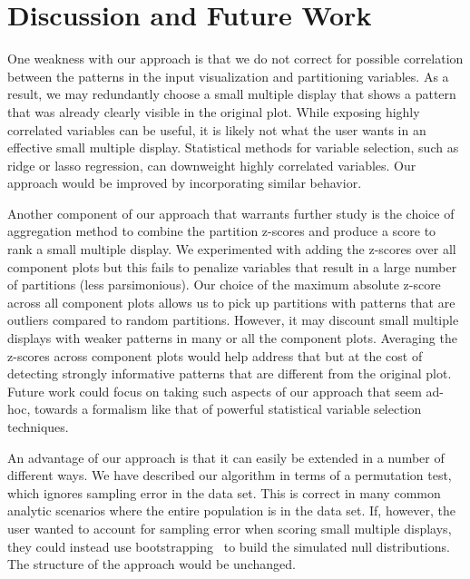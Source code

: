 \section{Discussion and Future Work}
\label{sec:discussion}
One weakness with our approach is that we do not correct for possible correlation between the patterns in the input visualization and partitioning variables. As a result, we may redundantly choose a small multiple display that shows a pattern that was already clearly visible in the original plot. While exposing highly correlated variables can be useful, it is likely not what the user wants in an effective small multiple display. Statistical methods for variable selection, such as ridge or lasso regression, can downweight highly correlated variables. Our approach would be improved by incorporating similar behavior. 

Another component of our approach that warrants further study is the choice of aggregation method to combine the partition z-scores and produce a score to rank a small multiple display. We experimented with adding the z-scores over all component plots but this fails to penalize variables that result in a large number of partitions (less parsimonious). Our choice of the maximum absolute z-score across all component plots allows us to pick up partitions with patterns that are outliers compared to random partitions. However, it may discount small multiple displays with weaker patterns in many or all the component plots. Averaging the z-scores across component plots would help address that but at the cost of detecting strongly informative patterns that are different from the original plot. Future work could focus on taking such aspects of our approach that seem ad-hoc, towards a formalism like that of powerful statistical variable selection techniques.%

An advantage of our approach is that it can easily be extended in a number of different ways. We have described our algorithm in terms of a permutation test, which ignores sampling error in the data set. This is correct in many common analytic scenarios where the entire population is in the data set. If, however, the user wanted to account for sampling error when scoring small multiple displays, they could instead use bootstrapping~\cite{Efron1994} to build the simulated null distributions. The structure of the approach would be unchanged.

